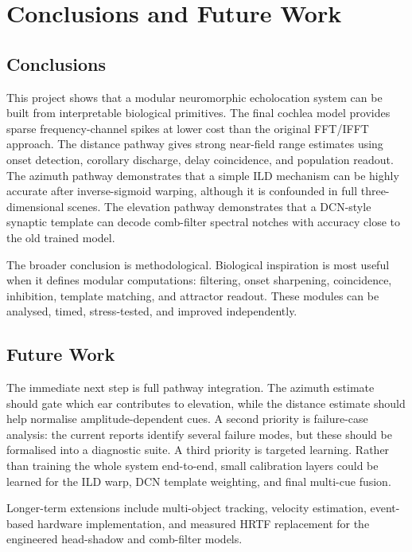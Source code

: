 \documentclass[12pt,a4paper]{report}
\begin{document}
\chapter{Conclusions and Future Work}

\section{Conclusions}

This project shows that a modular neuromorphic echolocation system can be built from interpretable biological primitives. The final cochlea model provides sparse frequency-channel spikes at lower cost than the original FFT/IFFT approach. The distance pathway gives strong near-field range estimates using onset detection, corollary discharge, delay coincidence, and population readout. The azimuth pathway demonstrates that a simple ILD mechanism can be highly accurate after inverse-sigmoid warping, although it is confounded in full three-dimensional scenes. The elevation pathway demonstrates that a DCN-style synaptic template can decode comb-filter spectral notches with accuracy close to the old trained model.

The broader conclusion is methodological. Biological inspiration is most useful when it defines modular computations: filtering, onset sharpening, coincidence, inhibition, template matching, and attractor readout. These modules can be analysed, timed, stress-tested, and improved independently.

\section{Future Work}

The immediate next step is full pathway integration. The azimuth estimate should gate which ear contributes to elevation, while the distance estimate should help normalise amplitude-dependent cues. A second priority is failure-case analysis: the current reports identify several failure modes, but these should be formalised into a diagnostic suite. A third priority is targeted learning. Rather than training the whole system end-to-end, small calibration layers could be learned for the ILD warp, DCN template weighting, and final multi-cue fusion.

Longer-term extensions include multi-object tracking, velocity estimation, event-based hardware implementation, and measured HRTF replacement for the engineered head-shadow and comb-filter models.
\end{document}
